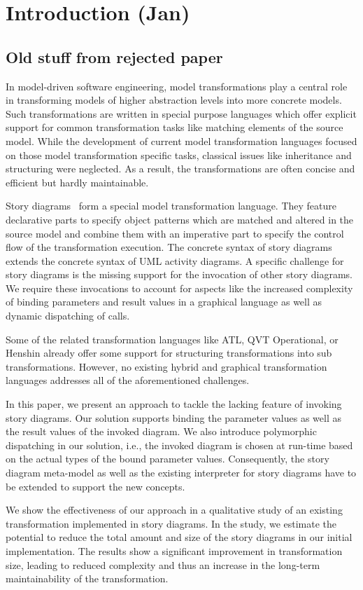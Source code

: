 \chapter{Introduction (Jan)}


\section*{Old stuff from rejected paper}
In model-driven software engineering, model transformations play a central role in transforming models of higher abstraction levels into more concrete models. 
Such transformations are written in special purpose languages which offer explicit support for common transformation tasks like matching elements of the source model.
While the development of current model transformation languages focused on those model transformation specific tasks, classical issues like inheritance and structuring were neglected.
As a result, the transformations are often concise and efficient but hardly maintainable.

Story diagrams~\cite{ZSW99,FNTZ00,Zun01} form a special model transformation language.
They feature declarative parts to specify object patterns which are matched and altered in the source model and combine them with an imperative part to specify the control flow of the transformation execution.
The concrete syntax of story diagrams extends the concrete syntax of UML activity diagrams.
A specific challenge for story diagrams is the missing support for the invocation of other story diagrams.
We require these invocations to account for aspects like the increased complexity of binding parameters and result values in a graphical language as well as dynamic dispatching of calls.

Some of the related transformation languages like ATL, QVT Operational, or Henshin already offer some support for structuring transformations into sub transformations.
However, no existing hybrid and graphical transformation languages addresses all of the aforementioned challenges. 

In this paper, we present an approach to tackle the lacking feature of invoking story diagrams.
Our solution supports binding the parameter values as well as the result values of the invoked diagram.
We also introduce polymorphic dispatching in our solution, i.e., the invoked diagram is chosen at run-time based on the actual types of the bound parameter values.
Consequently, the story diagram meta-model as well as the existing interpreter for story diagrams \cite{GHS09} have to be extended to support the new concepts. 

We show the effectiveness of our approach in a qualitative study of an existing transformation implemented in story diagrams. In the study, we estimate the potential to reduce the total amount and size of the story diagrams in our initial implementation. The results show a significant improvement in transformation size, leading to reduced complexity and thus an increase in the long-term maintainability of the transformation.

